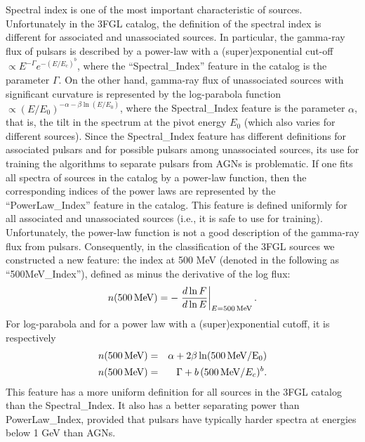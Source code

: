 \documentclass[referee]{aa} %
\newcommand{\bea}{\begin{eqnarray}}
\newcommand{\eea}{\end{eqnarray}}
\newcommand{\lb}{\label}
\newcommand{\al}{\alpha}
\newcommand{\bt}{\beta}
\begin{document}
Spectral index is one of the most important characteristic of sources. 
Unfortunately in the 3FGL catalog, the definition of the spectral index is different for associated and unassociated sources.
In particular, the gamma-ray flux of pulsars is described by a power-law with a (super)exponential cut-off $\propto E^{-\Gamma} e^{-(E / E_c)^b}$, where the ``Spectral\_Index'' feature in the catalog is the parameter $\Gamma$.
On the other hand, gamma-ray flux of unassociated sources with significant curvature is represented by the log-parabola function $\propto (E/E_0)^{-\al - \bt \ln (E/E_0)}$,
where the Spectral\_Index %
feature is the parameter $\al$, that is, the tilt in the spectrum at the pivot energy $E_0$ (which also varies for different sources).
Since the Spectral\_Index feature has different definitions for associated pulsars and for possible pulsars among unassociated sources,
its use for training the algorithms to separate pulsars from AGNs is problematic.
If one fits all spectra of sources in the catalog by a power-law function, then the corresponding indices of the power laws are represented by the
``PowerLaw\_Index'' feature in the catalog.
This feature is defined uniformly for all associated and unassociated sources (i.e., it is safe to use for training).
Unfortunately, the power-law function is not a good description of the gamma-ray flux from pulsars.
Consequently, in the classification of the 3FGL sources we constructed a new feature: the index at 500 MeV (denoted in the following as ``500MeV\_Index''), defined as minus the derivative of the log flux:
\bea
\lb{eq:n500_def}
n({\rm 500\,MeV}) = - \left. \frac{d \ln F}{d \ln E} \right|_{E = \rm 500\,MeV}
.\eea
For log-parabola and for a power law with a (super)exponential cutoff, it is respectively
\bea
n(\rm 500\,MeV) &=& \al + 2 \bt \ln(\rm 500\,MeV / E_0)    \\
n({\rm 500\,MeV}) &=& \Gamma + b\,({\rm 500\,MeV} / E_c)^b
.\eea
This feature has a more uniform definition for all sources in the 3FGL catalog than the Spectral\_Index. It also has a better separating power 
than PowerLaw\_Index, provided that pulsars have typically harder spectra at energies below 1 GeV than AGNs.
\end{document}
